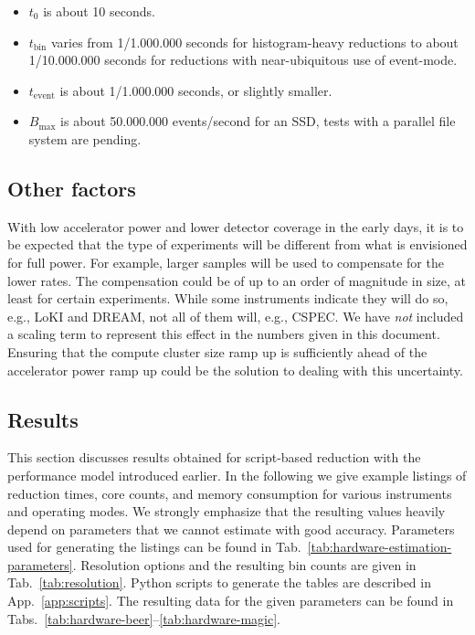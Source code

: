 \documentclass[a4paper,english,numbers=noenddot,bibliography=totoc,chapterprefix=on,DIV=12]{scrartcl}
\newcommand{\Tbin}{t_{\text{bin}}}
\newcommand{\Tevent}{t_{\text{event}}}
\newcommand{\Bmax}{B_{\text{max}}}
\newcommand{\cspec}{CSPEC\xspace}
\newcommand{\dream}{DREAM\xspace}
\newcommand{\loki}{LoKI\xspace}
\begin{document}
\begin{itemize}
\item $t_0$ is about 10 seconds.
\item $\Tbin$ varies from 1/1.000.000 seconds for histogram-heavy reductions to about 1/10.000.000 seconds for reductions with near-ubiquitous use of event-mode.
\item $\Tevent$ is about 1/1.000.000 seconds, or slightly smaller.
\item $\Bmax$ is about 50.000.000 events/second for an SSD, tests with a parallel file system are pending.
\end{itemize}


\subsection{Other factors}

With low accelerator power and lower detector coverage in the early days, it is to be expected that the type of experiments will be different from what is envisioned for full power.
For example, larger samples will be used to compensate for the lower rates.
The compensation could be of up to an order of magnitude in size, at least for certain experiments.
While some instruments indicate they will do so, e.g., \loki and \dream, not all of them will, e.g., \cspec.
We have \emph{not} included a scaling term to represent this effect in the numbers given in this document.
Ensuring that the compute cluster size ramp up is sufficiently ahead of the accelerator power ramp up could be the solution to dealing with this uncertainty.


\subsection{Results}
\label{sec:script-based-results}

This section discusses results obtained for script-based reduction with the performance model introduced earlier.
In the following we give example listings of reduction times, core counts, and memory consumption for various instruments and operating modes.
We strongly emphasize that the resulting values heavily depend on parameters that we cannot estimate with good accuracy.
Parameters used for generating the listings can be found in Tab.~\ref{tab:hardware-estimation-parameters}.
Resolution options and the resulting bin counts are given in Tab.~\ref{tab:resolution}.
Python scripts to generate the tables are described in App.~\ref{app:scripts}.
The resulting data for the given parameters can be found in Tabs.~\ref{tab:hardware-beer}--\ref{tab:hardware-magic}.
\end{document}
